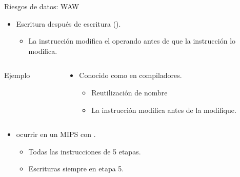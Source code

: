 \begin{frame}[t,fragile]{Riesgos de datos: WAW}
\begin{itemize}
  \item Escritura después de escritura ().
    \begin{itemize}
      \item La instrucción  modifica el operando antes de que la
            instrucción  lo modifica.
    \end{itemize}
\end{itemize}
\begin{columns}
\begin{column}{.25\textwidth}
\begin{block}{Ejemplo}

\end{block}
\end{column}
\begin{column}{.75\textwidth}
\begin{itemize}
  \item Conocido como  en compiladores.
    \begin{itemize}
      \item Reutilización de nombre
      \item La instrucción  modifica 
            antes de  la modifique.
    \end{itemize}
\end{itemize}
\end{column}
\end{columns}
\begin{itemize}
  \item {} ocurrir en un MIPS con .
  \begin{itemize}
    \item Todas las instrucciones de 5 etapas.
    \item Escrituras siempre en etapa 5.
  \end{itemize}
\end{itemize}
\end{frame}

